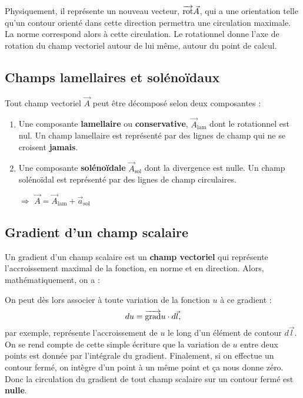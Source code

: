 \documentclass[12pt]{book}
\begin{document}
 Physiquement, il représente un nouveau vecteur, $\overrightarrow{\text{rot}} \vec{A}$, qui a une orientation telle qu'un contour orienté dans cette direction permettra une circulation maximale. La norme correspond alors à cette circulation. Le rotationnel donne l'axe de rotation du champ vectoriel autour de lui même, autour du point de calcul.
 \subsection{Champs lamellaires et solénoïdaux}
 Tout champ vectoriel $\vec{A}$ peut être décomposé selon deux composantes : 
 \begin{enumerate}
 \item Une composante \textbf{lamellaire} ou \textbf{conservative}, $\vec{A}_{\text{lam}}$ dont le rotationnel est nul. Un champ lamellaire est représenté par des lignes de champ qui ne se croisent \textbf{jamais}.
 \item Une composante \textbf{solénoïdale} $\vec{A}_{\text{sol}}$ dont la divergence est nulle. Un champ solénoïdal est représenté par des lignes de champ circulaires.
 \item[$\Rightarrow$] $\vec{A} = \vec{A}_{\text{lam}} + \vec{a}_{\text{sol}}$
 \end{enumerate}
 
 \subsection{Gradient d'un champ scalaire}
 Un gradient d'un champ scalaire est un \textbf{champ vectoriel} qui représente l'accroissement maximal de la fonction, en norme et en direction. Alors, mathématiquement, on a :
 
 On peut dès lors associer à toute variation de la fonction $u$ à ce gradient : $$du = \overrightarrow{\text{grad}} u \cdot  d\vec{l},$$ par exemple, représente l'accroissement de $u$ le long d'un élément de contour $d\vec{l}$. On se rend compte de cette simple écriture que la variation de $u$ entre deux points est donnée par l'intégrale du gradient. Finalement, si on effectue un contour fermé, on intègre d'un point à un même point et ça nous donne zéro. Donc la circulation du gradient de tout champ scalaire sur un contour fermé est \textbf{nulle}.
\end{document}
